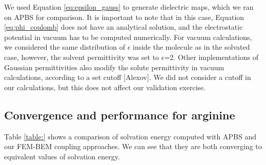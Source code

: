 We used Equation \eqref{eq:epsilon_gauss} to generate dielectric maps, which we ran on APBS for comparison. 
It is important to note that in this case, Equation \eqref{eq:phi_coulomb} does not have an analytical solution, and the electrostatic potential in vacuum has to be computed numerically.
For vacuum calculations, we considered the same distribution of $\epsilon$ inside the molecule as in the solvated case, however, the solvent permittivity was set to $\epsilon$=2. 
Other implementations of Gaussian permittivities also modify the solute permittivity in vacuum calculations, according to a set cutoff [Alexov]. 
We did not consider a cutoff in our calculations, but this does not affect our validation exercise. 

\subsection*{\sffamily \large Convergence and performance for arginine}

Table \ref{table:} shows a comparison of solvation energy computed with APBS and our FEM-BEM coupling approaches. We can see that they are both converging to equivalent values of solvation energy.

